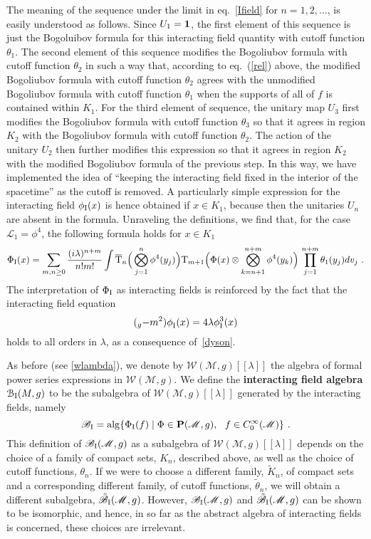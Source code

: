 \documentclass[12pt]{article}
\newcommand{\cB}{\mathcal{B}}
\newcommand{\rI}{{\rm I}}
\newcommand{\eB}{\mathscr{B}}
\newcommand{\eL}{\mathscr{L}}
\newcommand{\eW}{\mathscr{W}}
\newcommand{\M}{\mathscr{M}}
\newcommand{\myid}{{\bf 1}}
\renewcommand{\O}{\Phi}
\newcommand{\T}{{\rm T}}
\renewcommand{\P}{{\bf P}}
\newcommand{\rf}[1]{[\![#1]\!]}
\theoremstyle{plain}
\theoremstyle{definition}
\def\ben{\begin{equation}}
\def\een{\end{equation}}
\begin{document}
The meaning of the sequence under the limit in eq.~\eqref{Ifield} for $n = 1, 2, \dots$, is easily understood as follows. Since
$U_1 = \myid$, the first element of this sequence is just the
Bogoluibov formula for this interacting field quantity with cutoff
function $\theta_1$. The second element of this sequence modifies the
Bogoliubov formula with cutoff function $\theta_2$ in such a way that,
according to eq.~(\ref{rel}) above, the modified Bogoliubov formula
with cutoff function $\theta_2$ agrees with the unmodified Bogoliubov
formula with cutoff function $\theta_1$ when the supports of all of
$f$ is contained within $K_1$. For the third element of 
sequence, the unitary map $U_3$ first modifies the Bogoliubov formula
with cutoff function $\theta_3$ so that it agrees in region $K_2$ with
the Bogoliubov formula with cutoff function $\theta_2$. The action of
the unitary $U_2$ then further modifies this expression so that it
agrees in region $K_2$ with the modified Bogoliubov formula of the
previous step. In this way, we have implemented the idea of ``keeping
the interacting field fixed in the interior of the spacetime'' as the
cutoff is removed. A particularly simple expression for the interacting field
$\phi_\rI(x)$ is hence obtained if $x \in K_1$, because then the unitaries
$U_n$ are absent in the formula. Unraveling the definitions, we find that, for the
case $\eL_1 = \phi^4$, the following
formula holds for $x \in K_1$
\ben\label{ifield}
\O_\rI(x) = \sum_{m,n \ge 0} \frac{(i\lambda)^{n+m}}{n!m!} \int \overline
\T_n\Big( \bigotimes_{j=1}^n \phi^4(y_j) \Big)
\T_{m+1}\Big( \O(x) \otimes \bigotimes_{k=n+1}^{n+m} \phi^4(y_k)  \Big) \, \prod_{j=1}^{n+m} \theta_1(y_j) dv_j \ .
\een
The interpretation of $\O_\rI$ as interacting fields is reinforced by the fact that the interacting field
equation
\ben
(\square_g - m^2) \phi_\rI^{}(x) = 4\lambda \phi^3_\rI(x)
\een
holds to all orders in $\lambda$, as a consequence of~\eqref{dyson}. 

As before (see \eqref{wlambda}), we denote by $\eW(\M, g)\rf{\lambda}$ the algebra of formal power series expressions in $\eW(\M, g)$. We define the {\bf interacting field algebra} $\cB_{\rI}(M, g)$ to be
the subalgebra of $\eW(\M, g)\rf{\lambda}$ generated by the interacting
fields, namely
\ben
\eB_\rI = {\rm alg} \{ \O_\rI(f) \mid \O \in \P(\M,g), \ \ f \in C^\infty_0(\M) \} \ .
\een
This definition of $\eB_{\rI}(\M, g)$ as a subalgebra of $\eW(\M, g)\rf{\lambda}$
depends on the choice of a family of compact sets, $K_n$, described above, as well as the choice of cutoff functions,
$\theta_n$. If we were to choose a different family, $\tilde{K}_n$, of
compact sets and a corresponding different family,
of cutoff functions, $\tilde{\theta}_n$, we will obtain a different subalgebra, $\tilde{\eB}_{\rI}(\M, g)$. However,
$\eB_{\rI}(\M, g)$ and $\tilde{\eB}_{\rI}(\M, g)$ can be shown to be isomorphic, and hence, in so far as the abstract
algebra of interacting fields is concerned, these choices are irrelevant.
\end{document}
